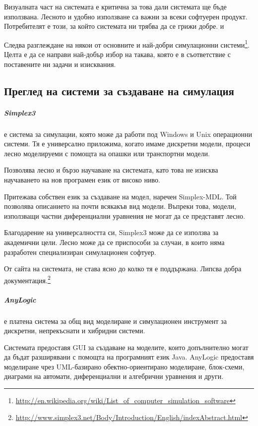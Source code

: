 		Визуалната част на системата е критична за това дали системата ще бъде използвана.
		Лесното и удобно използване са важни за всеки софтуерен продукт. 
		Потребителят е този, за който системата ни трябва да се грижи добре. \cite{Microsoft} и \cite{Krug}
		
		Следва разглеждане на някои от основните и най-добри симулационни 
		системи\footnote{\url{http://en.wikipedia.org/wiki/List_of_computer_simulation_software}}.
		Целта е да се направи най-добър избор на такава, която е в съответствие
		с поставените ни задачи и изисквания.
	
	\subsection{Преглед на системи за създаване на симулация}
	
		\subparagraph{Simplex3} е система за симулации, която може да работи под Windows и Unix операционни системи.
			Тя е универсално приложима, когато имаме дискретни модели, процеси 
			лесно моделируеми с помощта на опашки или транспортни модели.
						
			Позволява лесно и бързо научаване на системата, като това не изисква
			научаването на нов програмен език от високо ниво.			

			Притежава собствен език за създаване на модел, наречен Simplex-MDL. 
			Той позволява описанието на почти всякакъв вид модели. Въпреки това,
			модели, използващи частни диференциални уравнения не могат да се представят
			лесно.
		
			Благодарение на универсалността си, Simplex3 може да се използва за академични цели.
			Лесно може да се приспособи за случаи, в които няма разработен специализиран симулационен
			софтуер. 
		
			От сайта на системата, не става ясно до колко тя е поддържана. 
			Липсва добра документация.\footnote{\url{http://www.simplex3.net/Body/Introduction/English/indexAbstract.html}}
		
		\subparagraph{AnyLogic} е платена система за общ вид моделиране и симулационен инструмент за 
			дискретни, непрекъснати и хибридни системи.
			
			Системата предоставя \ac{GUI} за създаване на моделите, 
			които допълнително могат да бъдат разширявани с помощта на програмният език Java. 			
			AnyLogic предоставя моделиране чрез UML-базирано обектно-ориентирано моделиране, блок-схеми, 
			диаграми на автомати, диференциални и алгебрични уравнения и други.

